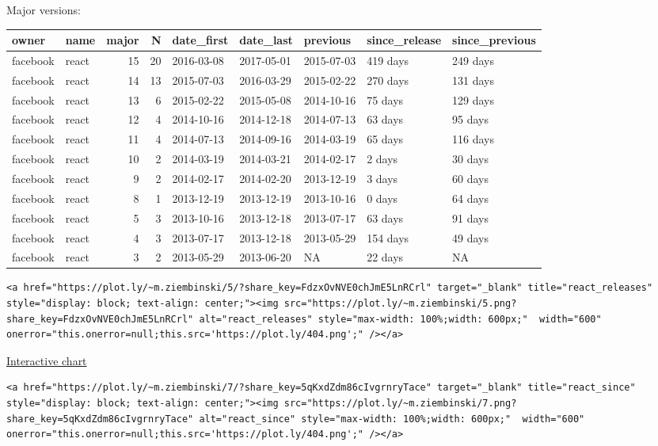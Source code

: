 Major versions:

\begin{longtable}[]{@{}llrrlllll@{}}
\toprule
owner & name & major & N & date\_first & date\_last & previous &
since\_release & since\_previous\tabularnewline
\midrule
\endhead
facebook & react & 15 & 20 & 2016-03-08 & 2017-05-01 & 2015-07-03 & 419
days & 249 days\tabularnewline
facebook & react & 14 & 13 & 2015-07-03 & 2016-03-29 & 2015-02-22 & 270
days & 131 days\tabularnewline
facebook & react & 13 & 6 & 2015-02-22 & 2015-05-08 & 2014-10-16 & 75
days & 129 days\tabularnewline
facebook & react & 12 & 4 & 2014-10-16 & 2014-12-18 & 2014-07-13 & 63
days & 95 days\tabularnewline
facebook & react & 11 & 4 & 2014-07-13 & 2014-09-16 & 2014-03-19 & 65
days & 116 days\tabularnewline
facebook & react & 10 & 2 & 2014-03-19 & 2014-03-21 & 2014-02-17 & 2
days & 30 days\tabularnewline
facebook & react & 9 & 2 & 2014-02-17 & 2014-02-20 & 2013-12-19 & 3 days
& 60 days\tabularnewline
facebook & react & 8 & 1 & 2013-12-19 & 2013-12-19 & 2013-10-16 & 0 days
& 64 days\tabularnewline
facebook & react & 5 & 3 & 2013-10-16 & 2013-12-18 & 2013-07-17 & 63
days & 91 days\tabularnewline
facebook & react & 4 & 3 & 2013-07-17 & 2013-12-18 & 2013-05-29 & 154
days & 49 days\tabularnewline
facebook & react & 3 & 2 & 2013-05-29 & 2013-06-20 & NA & 22 days &
NA\tabularnewline
\bottomrule
\end{longtable}

\begin{verbatim}
<a href="https://plot.ly/~m.ziembinski/5/?share_key=FdzxOvNVE0chJmE5LnRCrl" target="_blank" title="react_releases" style="display: block; text-align: center;"><img src="https://plot.ly/~m.ziembinski/5.png?share_key=FdzxOvNVE0chJmE5LnRCrl" alt="react_releases" style="max-width: 100%;width: 600px;"  width="600" onerror="this.onerror=null;this.src='https://plot.ly/404.png';" /></a>
\end{verbatim}

\href{https://plot.ly/~m.ziembinski/5/}{Interactive chart}

\begin{verbatim}
<a href="https://plot.ly/~m.ziembinski/7/?share_key=5qKxdZdm86cIvgrnryTace" target="_blank" title="react_since" style="display: block; text-align: center;"><img src="https://plot.ly/~m.ziembinski/7.png?share_key=5qKxdZdm86cIvgrnryTace" alt="react_since" style="max-width: 100%;width: 600px;"  width="600" onerror="this.onerror=null;this.src='https://plot.ly/404.png';" /></a>
\end{verbatim}

